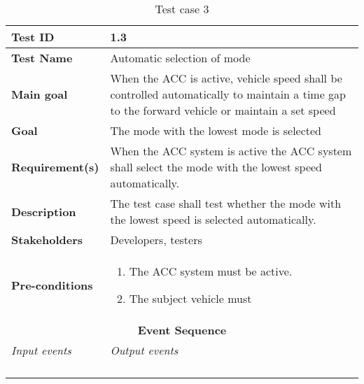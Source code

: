 \begin{table}[H]
\centering
\begin{tabularx}{\linewidth}{X|X}
  \hline
  \textbf{Test ID} & 1.3 \\
  \hline
  \textbf{Test Name} & Automatic selection of mode \\
  \hline
  \textbf{Main goal} & When the ACC is active, vehicle speed shall be controlled automatically to maintain a time gap to the forward vehicle or maintain a set speed  \\
  \hline
  \textbf{Goal} & The mode with the lowest mode is selected \\
  \hline
  \textbf{Requirement(s)} & When the ACC system is active the ACC system shall select the mode with the lowest speed automatically. \\
  \hline
  \textbf{Description} & The test case shall test whether the mode with the lowest speed is selected automatically.  \\
  \hline
  \textbf{Stakeholders} & Developers, testers \\
  \hline
  \textbf{Pre-conditions} & 
  \begin{enumerate}
      \item The ACC system must be active.
      \item The subject vehicle must 
  \end{enumerate}
  \\
  \hline
  \multicolumn{2}{c}{\textbf{Event Sequence}} \\
  \hline
  \textit{Input events} & \textit{Output events} \\
  \hline
   &  \\
  \hline
   &  \\
  \hline
   &  \\
  \hline
   &  \\
  \hline
  \end{tabularx}
\caption{\label{tab_case3} Test case 3}
\end{table}




